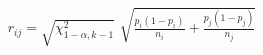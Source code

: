 \documentclass[12pt]{article}
\begin{document}
\pagestyle{empty}
\Large
{}
\pagecolor{ehandbook}

\boldmath

\begin{eqnarray*}
r_{ij} = \sqrt{\chi^2_{1-\alpha, k-1}} \,\, \sqrt{\frac{p_i(1-p_i)}{n_i} + \frac{p_j(1-p_j)}{n_j}}
\end{eqnarray*}
\end{document}
